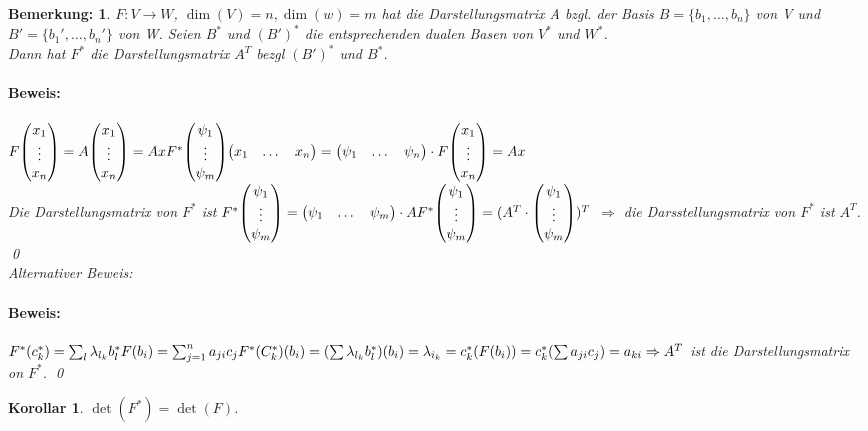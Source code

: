 \documentclass{report}
\newcommand{\lb}{\lambda}
\newcommand{\ve}[1]{{\begin{pmatrix}#1 \end{pmatrix}}}
\theoremstyle{customrem}
\newtheorem*{bemerkung}{Bemerkung\textnormal:}
\theoremstyle{customdef}
\newtheorem{korrolar}[definition]{Korollar}
\renewenvironment{proof}{\paragraph{Beweis: }}{\qed}
\theoremstyle{customenv}
\begin{document}
\begin{bemerkung}
  \(F : V \to W\), \(\dim(V) = n, \dim(w) = m\) hat die Darstellungsmatrix A
  bzgl. der Basis \(B = \{b_1, \dots, b_n\}\) von V und
  \(B' = \{b_1', \dots, b_n'\}\) von W. Seien \(B^*\) und \((B')^*\) die
  entsprechenden dualen Basen von \(V^*\) und \(W^*\).\\
  Dann hat \(F^*\) die Darstellungsmatrix \(A^T\) bezgl \((B')^*\) und \(B^*\).
  \begin{proof}\hfill\break
  \(F \ve{x_1 \\ \vdots \\ x_n} = A \ve{x_1 \\ \vdots \\ x_n} = A x\\
  F^* \ve{\psi_1 \\ \vdots \\ \psi_m} \ve {x_1 & \dots & x_n} = 
  \ve{\psi_1 & \dots & \psi_n} \cdot F \ve{x_1 \\ \vdots \\ x_n} = A x
  \)\\
  Die Darstellungsmatrix von \(F^*\) ist
  \(F^* \ve{\psi_1 \\ \vdots \\ \psi_m} = \ve{\psi_1 & \dots & \psi_m} \cdot A\\
  F^* \ve{\psi_1 \\ \vdots \\ \psi_m} = (A^T \cdot \ve{\psi_1 \\ \vdots \\ \psi_m})^T
  \)
  \(\Rightarrow\) die Darsstellungsmatrix von \(F^*\) ist \(A^T\).
  \end{proof}\\
  Alternativer Beweis:\\
  \begin{proof}\hfill\break
    \(F^*(c_k^*) = \sum_l \lb_{l_k} b_l^*\\
    F(b_i) = \sum_{j=1}^n a_{ji} c_j\\
    F^*(C_k^*)(b_i) = (\sum\lb_{l_k}b_l^*)(b_i) = \lb_{i_k}\\
    = c_k^*(F(b_i)) = c_k^*(\sum a_{ji} c_j) = a_{ki}\\
    \Rightarrow A^T
    \) ist die Darstellungsmatrix on \(F^*\).
  \end{proof}
\end{bemerkung}

\begin{korrolar}
  \(\det(F^*) = \det(F)\).
\end{korrolar}
\end{document}
